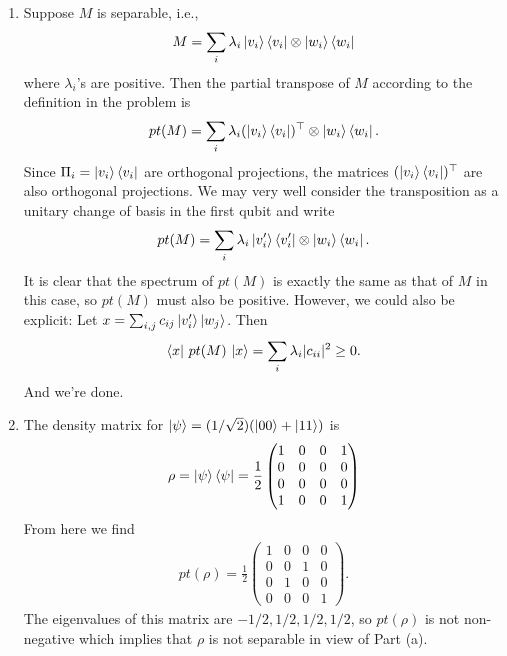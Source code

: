 \documentclass{article}
\theoremstyle{definition}
\newcommand{\f}[2]{\frac{#1}{#2}}
\begin{document}
\begin{enumerate}[label=(\alph*)]
	\item Suppose $M$ is separable, i.e., 
	\begin{align*}
		M = \sum_i \lambda_i \ket{v_i} \bra{v_i} \otimes \ket{w_i}\bra{w_i}
	\end{align*}
	where $\lambda_i$'s are positive. Then the partial transpose of $M$ according to the definition in the problem is
	\begin{align*}
		pt(M) = \sum_i \lambda_i (\ket{v_i}\bra{v_i})^\top \otimes \ket{w_i}\bra{w_i}.
	\end{align*} 
	Since  $\Pi_i = \ket{v_i}\bra{v_i}$ are orthogonal projections, the matrices $(\ket{v_i}\bra{v_i})^\top$ are also orthogonal projections. We may very well consider the transposition as a unitary change of basis in the first qubit and write
	\begin{align*}
		pt(M) = \sum_i \lambda_i \ket{v_i'}\bra{v_i'} \otimes \ket{w_i}\bra{w_i}.
	\end{align*}
	It is clear that the spectrum of $pt(M)$ is exactly the same as that of $M$ in this case, so $pt(M)$ must also be positive. However, we could also be explicit: Let $x = \sum_{i,j} c_{ij} \ket{v_i'}\ket{w_j}$. Then
	\begin{align*}
		\bra{x}  \, pt(M)\, \ket{x} = \sum_i \lambda_i |c_{ii}|^2 \geq 0.
	\end{align*}
	And we're done. 
	
	\item The density matrix for $\ket{\psi} = (1/\sqrt{2})(\ket{00} + \ket{11})$ is 
	\begin{align*}
		\rho = \ket{\psi} \bra{\psi} = \f{1}{2}\begin{pmatrix}
			1 & 0 & 0 & 1 \\
			0 & 0 & 0 & 0 \\
			0 & 0 & 0 & 0 \\
			1 & 0 & 0 & 1
		\end{pmatrix}
	\end{align*}
	From here we find 
	\begin{align*}
		pt(\rho) =  \f{1}{2}\begin{pmatrix}
			1 & 0 & 0 & 0 \\
			0 & 0 & 1 & 0 \\
			0 & 1 & 0 & 0 \\
			0 & 0 & 0 & 1
		\end{pmatrix}.
	\end{align*}
The eigenvalues of this matrix are $-1/2,1/2,1/2,1/2$, so $pt(\rho)$ is not non-negative which implies that $\rho$ is not separable in view of Part (a).
\end{enumerate}
\end{document}
